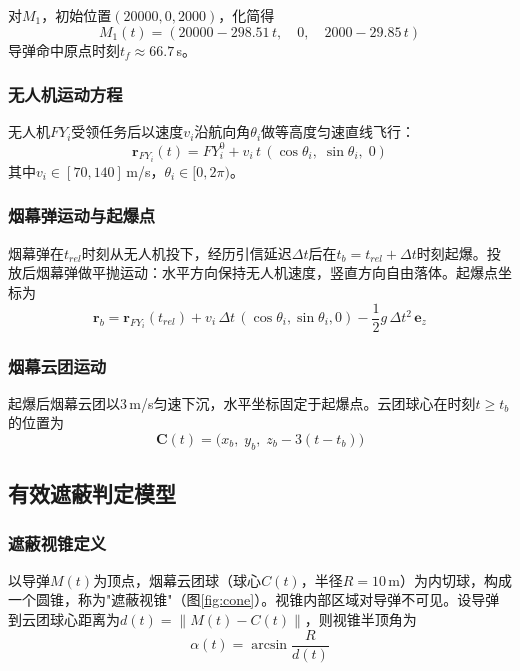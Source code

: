 \documentclass[12pt,a4paper]{article}
\begin{document}
对$M_1$，初始位置$(20000, 0, 2000)$，化简得
\begin{equation}
M_1(t) = (20000 - 298.51\,t, \quad 0, \quad 2000 - 29.85\,t)
\end{equation}
导弹命中原点时刻$t_f \approx 66.7$\,s。

\subsubsection{无人机运动方程}

无人机$FY_i$受领任务后以速度$v_i$沿航向角$\theta_i$做等高度匀速直线飞行：
\begin{equation}
\mathbf{r}_{FY_i}(t) = FY_i^0 + v_i \, t \, (\cos\theta_i, \; \sin\theta_i, \; 0)
\end{equation}
其中$v_i \in [70, 140]$\,m/s，$\theta_i \in [0, 2\pi)$。

\subsubsection{烟幕弹运动与起爆点}

烟幕弹在$t_{rel}$时刻从无人机投下，经历引信延迟$\Delta t$后在$t_b = t_{rel} + \Delta t$时刻起爆。投放后烟幕弹做平抛运动：水平方向保持无人机速度，竖直方向自由落体。起爆点坐标为
\begin{equation}
\mathbf{r}_b = \mathbf{r}_{FY_i}(t_{rel}) + v_i \, \Delta t \, (\cos\theta_i, \sin\theta_i, 0) - \frac{1}{2}g\,\Delta t^2 \, \mathbf{e}_z
\end{equation}

\subsubsection{烟幕云团运动}

起爆后烟幕云团以3\,m/s匀速下沉，水平坐标固定于起爆点。云团球心在时刻$t \geq t_b$的位置为
\begin{equation}
\mathbf{C}(t) = \big(x_b, \; y_b, \; z_b - 3(t - t_b)\big)
\end{equation}

\subsection{有效遮蔽判定模型}

\subsubsection{遮蔽视锥定义}

以导弹$M(t)$为顶点，烟幕云团球（球心$C(t)$，半径$R=10$\,m）为内切球，构成一个圆锥，称为"遮蔽视锥"（图\ref{fig:cone}）。视锥内部区域对导弹不可见。设导弹到云团球心距离为$d(t) = \|M(t) - C(t)\|$，则视锥半顶角为
\begin{equation}
\alpha(t) = \arcsin\frac{R}{d(t)}
\end{equation}
\end{document}
